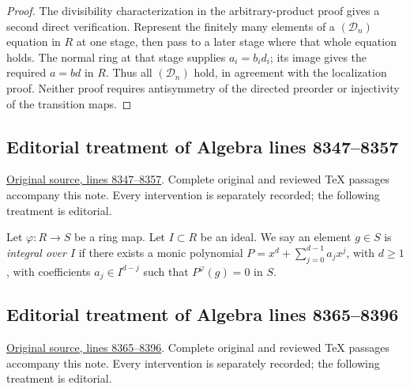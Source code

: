 \begin{proof}
The divisibility characterization in the arbitrary-product proof
gives a second direct verification. Represent the finitely many
elements of a $(\mathcal D_n)$ equation in $R$ at one stage,
then pass to a later stage where that whole equation holds.
The normal ring at that stage supplies $a_i=b_id_i$;
its image gives the required $a=bd$ in $R$. Thus all
$(\mathcal D_n)$ hold, in agreement with the localization proof.
Neither proof requires antisymmetry of the directed preorder
or injectivity of the transition maps.
\end{proof}










\subsection{Editorial treatment of Algebra lines 8347--8357}

\hypertarget{algebra-context-090}{}

\noindent\href{https://github.com/stacks/stacks-project/blob/a04446e57ec1fbc252a871afcec7752fb2807b14/algebra.tex\#L8347}{Original source, lines 8347--8357}. Complete original and reviewed TeX passages accompany this note. Every intervention is separately recorded; the following treatment is editorial.


\begin{definition}
\label{editorial-source-definition-integral-over-ideal}
Let $\varphi : R \to S$ be a ring map.
Let $I \subset R$ be an ideal.
We say an element $g \in S$ is
{\it integral over $I$} if
there exists a monic
polynomial $P = x^d + \sum_{j=0}^{d-1} a_j x^j$, with $d\geq1$,
with coefficients $a_j \in I^{d-j}$ such
that $P^\varphi(g) = 0$ in $S$.
\end{definition}


\subsection{Editorial treatment of Algebra lines 8365--8396}

\hypertarget{algebra-context-091}{}

\noindent\href{https://github.com/stacks/stacks-project/blob/a04446e57ec1fbc252a871afcec7752fb2807b14/algebra.tex\#L8365}{Original source, lines 8365--8396}. Complete original and reviewed TeX passages accompany this note. Every intervention is separately recorded; the following treatment is editorial.


